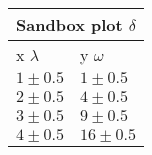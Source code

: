 \documentclass{article}
\begin{document}
\begin{tabular}{|p{3cm}|p{3cm}|}
\hline
\multicolumn{2}{|c|}{Sandbox plot $\delta$}\\
\hline
x $\lambda$&y $\omega$\\
\hline
$1\pm0.5$&$1\pm 0.5$\\
$2\pm0.5$&$4\pm 0.5$\\
$3\pm0.5$&$9\pm 0.5$\\
$4\pm0.5$&$16\pm 0.5$\\
\hline
\end{tabular}
\end{document}

